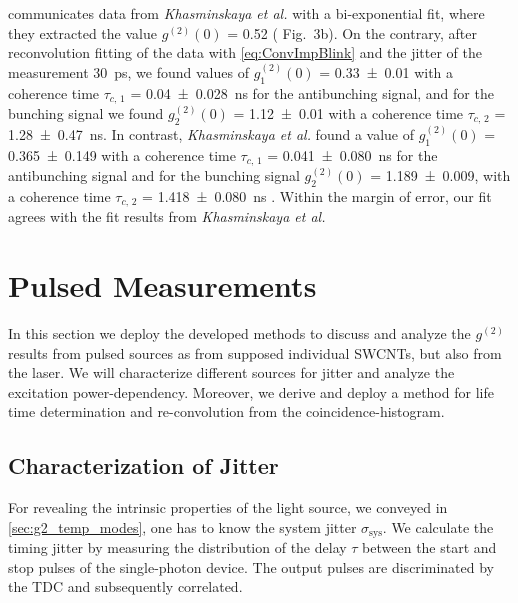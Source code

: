  communicates data from \textit{Khasminskaya et al.} with a bi-exponential fit, where they extracted the value $g^{(2)}(0)$ = \num{0.52} (\cite{khasminskaya_fully_2016} Fig.~3b). On the contrary, after reconvolution fitting of the data with \cref{eq:ConvImpBlink} and the jitter of the measurement \SI{30}{\ps}, we found values of $g^{(2)}_{1}(0)$ = \num{0.33\pm0.01} with a coherence time $\tau_{c,\,1}$ = \SI{0.04\pm0.028}{\ns} for the antibunching signal, and for the bunching signal we found $g^{(2)}_{2}(0)$ = \num{1.12\pm0.01} with a coherence time $\tau_{c,\,2}$ = \SI{1.28\pm0.47}{\ns}. In contrast, \textit{Khasminskaya et al.} found a value of $g^{(2)}_{1}(0)$ = \num{0.365\pm0.149} with a coherence time $\tau_{c,\,1}$ = \SI{0.041\pm0.080}{\ns} for the antibunching signal \cite{khasminskaya_fully_2016} and for the bunching signal $g^{(2)}_{2}(0)$ = \num{1.189\pm0.009}, with a coherence time $\tau_{c,\,2}$ = \SI{1.418\pm0.080}{\ns} \cite{khasminskaya_fully_2016}. Within the margin of error, our fit agrees with the fit results from \textit{Khasminskaya et al.}

\section{Pulsed Measurements}
In this section we deploy the developed methods to discuss and analyze the $g^{(2)}$ results from pulsed sources as from supposed individual \acp{SWCNT}, but also from the laser. We will characterize different sources for jitter and analyze the excitation power-dependency. Moreover, we derive and deploy a method for life time determination and re-convolution from the coincidence-histogram.

\subsection{Characterization of Jitter} 
For revealing the intrinsic properties of the light source, we conveyed in \cref{sec:g2_temp_modes}, one has to know the system jitter $\sigma_\mathrm{sys}$. We calculate the timing jitter by measuring the distribution of the delay $\tau$ between the start and stop pulses of the single-photon device. The output pulses are discriminated by the TDC and subsequently correlated.

